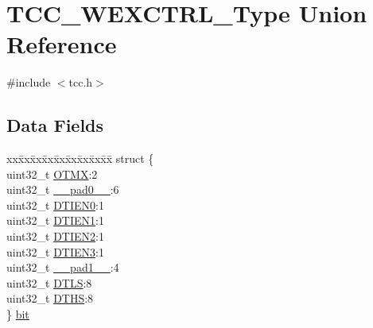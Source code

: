 \hypertarget{union_t_c_c___w_e_x_c_t_r_l___type}{}\section{T\+C\+C\+\_\+\+W\+E\+X\+C\+T\+R\+L\+\_\+\+Type Union Reference}
\label{union_t_c_c___w_e_x_c_t_r_l___type}


{\ttfamily \#include $<$tcc.\+h$>$}

\subsection*{Data Fields}
\begin{DoxyCompactItemize}
\item 
\begin{tabbing}
xx\=xx\=xx\=xx\=xx\=xx\=xx\=xx\=xx\=\kill
struct \{\\
\>uint32\_t \mbox{\hyperlink{union_t_c_c___w_e_x_c_t_r_l___type_ae8d46d38c662a758a9c892b65561f694}{OTMX}}:2\\
\>uint32\_t \mbox{\hyperlink{union_t_c_c___w_e_x_c_t_r_l___type_a3e57c2ef1c3ffb36722f000cc1156824}{\_\_pad0\_\_}}:6\\
\>uint32\_t \mbox{\hyperlink{union_t_c_c___w_e_x_c_t_r_l___type_a48c681714aab86e52b9b0612b4d13c78}{DTIEN0}}:1\\
\>uint32\_t \mbox{\hyperlink{union_t_c_c___w_e_x_c_t_r_l___type_ac1a5aec82c46b573d94bef41f9c552d9}{DTIEN1}}:1\\
\>uint32\_t \mbox{\hyperlink{union_t_c_c___w_e_x_c_t_r_l___type_a8d52c6ac47723f242aed48c5050bea14}{DTIEN2}}:1\\
\>uint32\_t \mbox{\hyperlink{union_t_c_c___w_e_x_c_t_r_l___type_a630a97ec431e0b91c0cb2450f6c85d90}{DTIEN3}}:1\\
\>uint32\_t \mbox{\hyperlink{union_t_c_c___w_e_x_c_t_r_l___type_a6712ba6dd1d5b43d2d56ff8ac4e275a7}{\_\_pad1\_\_}}:4\\
\>uint32\_t \mbox{\hyperlink{union_t_c_c___w_e_x_c_t_r_l___type_ae0b57aa59462791c182394e23190738c}{DTLS}}:8\\
\>uint32\_t \mbox{\hyperlink{union_t_c_c___w_e_x_c_t_r_l___type_aa3183162083d89b9dad21743f240ecf5}{DTHS}}:8\\
\} \mbox{\hyperlink{union_t_c_c___w_e_x_c_t_r_l___type_a520c3c4ccaacb3540cbecf9dfa462d0e}{bit}}\\


\end{tabbing}
\end{DoxyCompactItemize}
